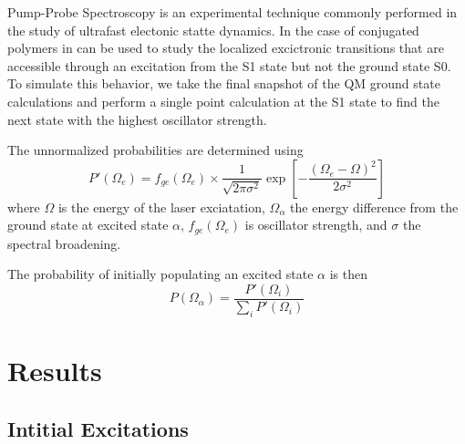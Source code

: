 Pump-Probe Spectroscopy is an experimental technique commonly performed in the
study of ultrafast electonic statte dynamics. In the case of conjugated polymers
in can be used to study the localized excictronic transitions that are
accessible through an excitation from the S1 state but not the ground state S0.
To simulate this behavior, we take the final snapshot of the QM ground state
calculations and perform a single point calculation at the S1 state to find the
next state with the highest oscillator strength.

The unnormalized probabilities are determined using
    \begin{equation}
      P'(\Omega_e) = f_{ge}(\Omega_e) \times \frac{1}{\sqrt{2\pi \sigma^2}} \exp \left[ - \frac{(\Omega_e - \Omega)^2}{2\sigma^2} \right]
    \end{equation}
where \(\Omega\) is the energy of the laser exciatation, \(\Omega_\alpha\) the energy difference from the ground state at excited state \(\alpha\), \(f_{ge}(\Omega_e)\) is oscillator strength, and \(\sigma\) the spectral broadening.  

The probability of initially populating an excited state \(\alpha\) is then
\begin{equation}
  P(\Omega_\alpha) = \frac{P'(\Omega_i)}{\sum_i P'(\Omega_i)}
\end{equation}

\section{Results}

\subsection{Intitial Excitations}

